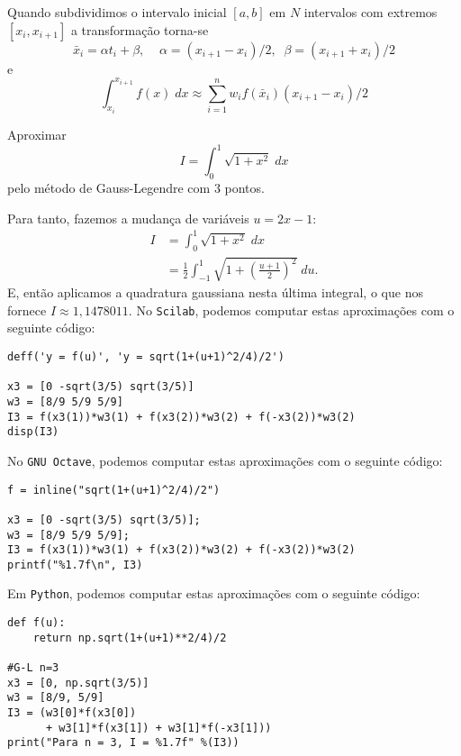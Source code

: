 Quando subdividimos o intervalo inicial $[a,b]$ em $N$ intervalos com extremos $[x_i,x_{i+1}]$ a transformação torna-se
\begin{equation}
  \bar{x}_i = \alpha t_i + \beta, \;\;  \;\; \alpha =(x_{i+1}-x_i)/2, \;\; \beta = (x_{i+1}+x_i)/2
\end{equation}
e
\begin{equation}
 \int_{x_i}^{x_{i+1}} f(x) \; dx \approx \sum_{i=1}^n w_i f( \bar{x}_i ) (x_{i+1}-x_i)/2
\end{equation}

\begin{ex} Aproximar
\begin{equation} I = \int_{0}^1\sqrt{1+x^2} \;dx \end{equation}
pelo método de Gauss-Legendre com 3 pontos.
\end{ex}
\begin{sol}
Para tanto, fazemos a mudança de variáveis $u=2x-1$:
\begin{equation}
  \begin{split}
    I &= \int_{0}^1\sqrt{1+x^2} \;dx\\
    &= \frac{1}{2}\int_{-1}^1\sqrt{1+\left(\frac{u+1}{2}\right)^2}\;du.
  \end{split}
\end{equation}
E, então aplicamos a quadratura gaussiana nesta última integral, o que nos fornece $I \approx 1,1478011$.
\ifisscilab
No \verb+Scilab+, podemos computar estas aproximações com o seguinte código:
\begin{verbatim}
deff('y = f(u)', 'y = sqrt(1+(u+1)^2/4)/2')

x3 = [0 -sqrt(3/5) sqrt(3/5)]
w3 = [8/9 5/9 5/9]
I3 = f(x3(1))*w3(1) + f(x3(2))*w3(2) + f(-x3(2))*w3(2)
disp(I3)
\end{verbatim}
\fi
\ifisoctave
No \verb+GNU Octave+, podemos computar estas aproximações com o seguinte código:
\begin{verbatim}
f = inline("sqrt(1+(u+1)^2/4)/2")

x3 = [0 -sqrt(3/5) sqrt(3/5)];
w3 = [8/9 5/9 5/9];
I3 = f(x3(1))*w3(1) + f(x3(2))*w3(2) + f(-x3(2))*w3(2)
printf("%1.7f\n", I3)
\end{verbatim}
\fi
\ifispython
Em \verb+Python+, podemos computar estas aproximações com o seguinte código:
\begin{verbatim}
def f(u):
    return np.sqrt(1+(u+1)**2/4)/2

#G-L n=3
x3 = [0, np.sqrt(3/5)]
w3 = [8/9, 5/9]
I3 = (w3[0]*f(x3[0])
      + w3[1]*f(x3[1]) + w3[1]*f(-x3[1]))
print("Para n = 3, I = %1.7f" %(I3))
\end{verbatim}
\fi
\end{sol}


